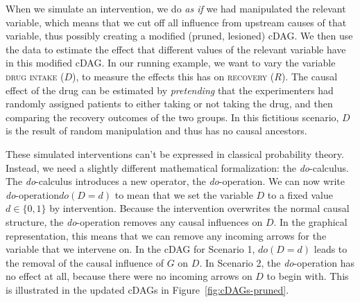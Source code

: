 \documentclass[nobib]{tufte-handout}
\newcommand{\docalc}{\emph{do}-calculus\xspace}
\newcommand{\doop}{\emph{do}-operation\xspace}
\newcommand{\mathdo}{\mathit{do}}
\begin{document}
When we simulate an intervention, we do \textit{as if} we had manipulated the relevant variable, which means that we cut off all influence from upstream causes of that variable, thus possibly creating a modified (pruned, lesioned) cDAG.
We then use the data to estimate the effect that different values of the relevant variable have in this modified cDAG.
In our running example, we want to vary the variable \textsc{drug intake} ($D$), to measure the effects this has on \textsc{recovery} ($R$).
The causal effect of the drug can be estimated by \textit{pretending} that the experimenters had randomly assigned patients to either taking or not taking the drug, and then comparing the recovery outcomes of the two groups.
In this fictitious scenario, $D$ is the result of random manipulation and thus has no causal ancestors.

These simulated interventions can't be expressed in classical probability theory.
Instead, we need a slightly different mathematical formalization: the \docalc. 
The \docalc introduces a new operator, the \doop.
We can now write \doop $\mathdo(D=d)$ to mean that we set the variable $D$ to a fixed value $d \in \{0,1\}$ by intervention.
Because the intervention overwrites the normal causal structure, the \doop removes any causal influences on $D$.
In the graphical representation, this means that we can remove any incoming arrows for the variable that we intervene on.
In the cDAG for Scenario 1, $\mathdo(D=d)$ leads to the removal of the causal influence of $G$ on $D$.
In Scenario 2, the \doop has no effect at all, because there were no incoming arrows on $D$ to begin with.
This is illustrated in the updated cDAGs in Figure~\ref{fig:cDAGs-pruned}.
\end{document}
